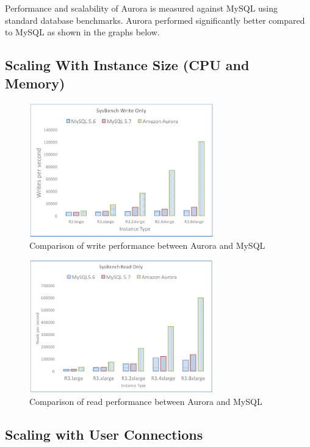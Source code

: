 \documentclass[conference]{IEEEtran}
\begin{document}
Performance and scalability of Aurora is measured against MySQL using standard database benchmarks. Aurora performed significantly better compared to MySQL as shown in the graphs below.

\subsection{Scaling With Instance Size (CPU and Memory)}

\begin{figure}[!htb]
    \centering
    \includegraphics[width=8cm]{../images/write_only.png}
    \caption{Comparison of write performance between Aurora and MySQL}
\end{figure}

\begin{figure}[!htb]
    \centering
    \includegraphics[width=8cm]{../images/read_only.png}
    \caption{Comparison of read performance between Aurora and MySQL}
\end{figure}


\subsection{Scaling with User Connections}
\begin{table}[!htb]
\end{table}



\end{document}
